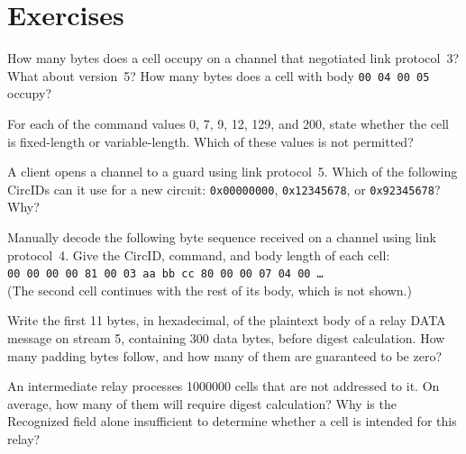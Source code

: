 \section*{Exercises}

\begin{esercizio}[1]\label{es:08-lunghezze}
How many bytes does a  cell occupy on a channel that negotiated link protocol~3? What about version~5? How many bytes does a  cell with body \texttt{00 04 00 05} occupy?
\end{esercizio}

\begin{esercizio}[1]\label{es:08-formato}
For each of the command values 0, 7, 9, 12, 129, and 200, state whether the cell is fixed-length or variable-length. Which of these values is not permitted?
\end{esercizio}

\begin{esercizio}[1]\label{es:08-circid}
A client opens a channel to a guard using link protocol~5. Which of the following CircIDs can it use for a new circuit: \texttt{0x00000000}, \texttt{0x12345678}, or \texttt{0x92345678}? Why?
\end{esercizio}

\begin{esercizio}[2]\label{es:08-hex}
Manually decode the following byte sequence received on a channel using link protocol~4. Give the CircID, command, and body length of each cell:\\
\texttt{00 00 00 00 81 00 03 aa bb cc 80 00 00 07 04 00 \ldots}\\
(The second cell continues with the rest of its body, which is not shown.)
\end{esercizio}

\begin{esercizio}[2]\label{es:08-relay}
Write the first 11 bytes, in hexadecimal, of the plaintext body of a relay DATA message on stream 5, containing 300 data bytes, before digest calculation. How many padding bytes follow, and how many of them are guaranteed to be zero?
\end{esercizio}

\begin{esercizio}[2]\label{es:08-recognized}
An intermediate relay processes \num{1000000} cells that are not addressed to it. On average, how many of them will require digest calculation? Why is the Recognized field alone insufficient to determine whether a cell is intended for this relay?
\end{esercizio}


